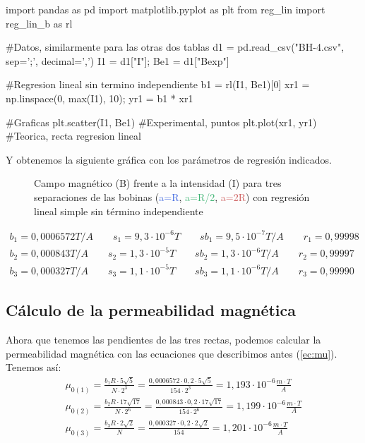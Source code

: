 \documentclass[12pt, a4paper, titlepage]{article}
\begin{document}
  \begin{python}
    import pandas as pd
    import matplotlib.pyplot as plt
    from reg_lin import reg_lin_b as rl

    #Datos, similarmente para las otras dos tablas
    d1 = pd.read_csv("BH-4.csv", sep=';', decimal=',')
    I1 = d1["I"]; Be1 = d1["Bexp"]

    #Regresion lineal sin termino independiente
    b1 = rl(I1, Be1)[0]
    xr1 = np.linspace(0, max(I1), 10); yr1 = b1 * xr1

    #Graficas
    plt.scatter(I1, Be1) #Experimental, puntos
    plt.plot(xr1, yr1) #Teorica, recta regresion lineal
  \end{python}

  Y obtenemos la siguiente gráfica con los parámetros de regresión indicados.

  \begin{figure}[H]
    \hspace{2.5em} 
    \caption{Campo magnético (B) frente a la intensidad (I) para tres separaciones de las bobinas (\textcolor{RoyalBlue}{a=R}, \textcolor{MediumSeaGreen}{a=R/2}, \textcolor{IndianRed}{a=2R}) con regresión lineal simple sin término independiente}
  \end{figure}
  \begin{gather*}
    b_1 = 0,0006572 T/A \qquad s_1 = 9,3 \cdot 10^{-6} T \qquad sb_1 = 9,5 \cdot 10^{-7} T/A \qquad r_1 = 0,99998 \\
    b_2 = 0,000843 T/A \qquad s_2 = 1,3 \cdot 10^{-5} T \qquad sb_2 = 1,3 \cdot 10^{-6} T/A \qquad r_2 = 0,99997 \\
    b_3 = 0,000327 T/A \qquad s_3 = 1,1 \cdot 10^{-5} T \qquad sb_3 = 1,1 \cdot 10^{-6} T/A \qquad r_3 = 0,99990
  \end{gather*}

  \subsection{Cálculo de la permeabilidad magnética}

  Ahora que tenemos las pendientes de las tres rectas, podemos calcular la permeabilidad magnética con las ecuaciones que describimos antes (\ref{ec:mu}). Tenemos así:
  \begin{gather*}
    \mu_{0(1)} = \frac{b_1 R \cdot 5 \sqrt{5}}{N \cdot 2^3} = \frac{0,0006572 \cdot 0,2 \cdot 5 \sqrt{5}}{154 \cdot 2^3} = 1,193 \cdot 10^{-6} \frac{m \cdot T}{A} \\
    \mu_{0(2)} = \frac{b_2 R \cdot 17 \sqrt{17}}{N \cdot 2^6} = \frac{0,000843 \cdot 0,2 \cdot 17 \sqrt{17}}{154 \cdot 2^6} = 1,199 \cdot 10^{-6} \frac{m \cdot T}{A}\\
    \mu_{0(3)} = \frac{b_3 R \cdot 2 \sqrt{2}}{N} = \frac{0,000327 \cdot 0,2 \cdot 2 \sqrt{2}}{154} = 1,201 \cdot 10^{-6} \frac{m \cdot T}{A}
  \end{gather*}
\end{document}
